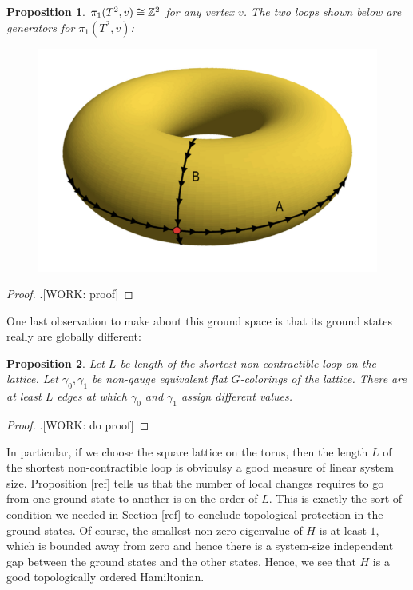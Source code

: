\documentclass{article}
\newtheorem{proposition}{Proposition}[section]
\theoremstyle{definition}
\numberwithin{figure}{section}
\begin{document}
\begin{proposition} $\pi_1(T^2,v)\cong \mathbb{Z}^2$ for any vertex $v$. The two loops shown below are generators for $\pi_1(T^2,v)$:

\begin{figure}[h]
\begin{center}
\includegraphics[scale=.3]{torus}
\end{center}
\end{figure}

\end{proposition}
\begin{proof}.[WORK: proof]
\end{proof}

One last observation to make about this ground space is that its ground states really are globally different:

\begin{proposition} Let $L$ be length of the shortest non-contractible loop on the lattice. Let $\gamma_0,\gamma_1$ be non-gauge equivalent flat $G$-colorings of the lattice. There are at least $L$ edges at which $\gamma_0$ and $\gamma_1$ assign different values.
\end{proposition} 
\begin{proof}.[WORK: do proof]
\end{proof}

In particular, if we choose the square lattice on the torus, then the length $L$ of the shortest non-contractible loop is obvioulsy a good measure of linear system size. Proposition [ref] tells us that the number of local changes requires to go from one ground state to another is on the order of $L$. This is exactly the sort of condition we needed in Section [ref] to conclude topological protection in the ground states. Of course, the smallest non-zero eigenvalue of $H$ is at least $1$, which is bounded away from zero and hence there is a system-size independent gap between the ground states and the other states. Hence, we see that $H$ is a good topologically ordered Hamiltonian. 
\end{document}
